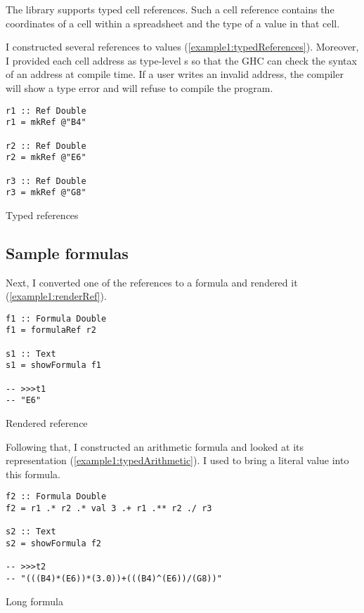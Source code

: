 The \clerk library supports typed cell references. Such a cell reference contains the coordinates of a cell within a spreadsheet and the type of a value in that cell.


I constructed several references to  values (\cref{example1:typedReferences}). Moreover, I provided each cell address as type-level s so that the GHC can check the syntax of an address at compile time. If a user writes an invalid address, the compiler will show a type error and will refuse to compile the program.

\begin{listing}[!h]
  \begin{verbatim}
r1 :: Ref Double
r1 = mkRef @"B4"

r2 :: Ref Double
r2 = mkRef @"E6"

r3 :: Ref Double
r3 = mkRef @"G8"
\end{verbatim}
  \caption{Typed references}
  \label{example1:typedReferences}
\end{listing}

\newpage

\subsection{Sample formulas}
Next, I converted one of the references to a formula and rendered it (\cref{example1:renderRef}).

\begin{listing}[!h]
  \begin{verbatim}
f1 :: Formula Double
f1 = formulaRef r2

s1 :: Text
s1 = showFormula f1

-- >>>t1
-- "E6"
\end{verbatim}
  \caption{Rendered reference}
  \label{example1:renderRef}
\end{listing}

Following that, I constructed an arithmetic formula and looked at its representation (\cref{example1:typedArithmetic}). I used  to bring a literal value into this formula.

\begin{listing}[!h]
  \begin{verbatim}
f2 :: Formula Double
f2 = r1 .* r2 .* val 3 .+ r1 .** r2 ./ r3

s2 :: Text
s2 = showFormula f2

-- >>>t2
-- "(((B4)*(E6))*(3.0))+(((B4)^(E6))/(G8))"
\end{verbatim}
  \caption{Long formula}
  \label{example1:typedArithmetic}
\end{listing}


